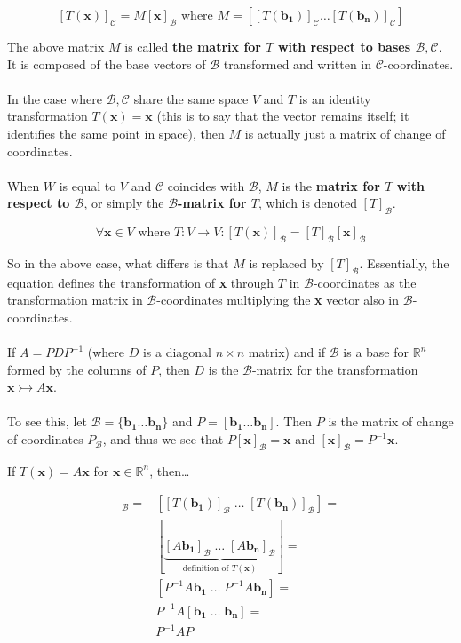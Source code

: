 \documentclass[12pt]{article}
\newcommand{\R}{\mathbb{R}}
\newcommand{\bt}[1]{\textbf{{#1}}}
\newcommand{\bm}[1]{\mathbf{{#1}}}
\newcommand{\mmc}[1]{\mathcal{{#1}}}
\newcommand{\set}[1]{\{{#1}\}}
\begin{document}
$$[T(\bm{x})]_\mmc{C} = M[\bm{x}]_\mmc{B} \textrm{ where } M = [[T(\bm{b_1})]_\mmc{C} \dots [T(\bm{b_n})]_\mmc{C}]$$

The above matrix $M$ is called \bt{the matrix for $T$ with respect to bases $\mmc{B, C}$}. It is composed of the base vectors of $\mmc{B}$ transformed and written
in $\mmc{C}$-coordinates. \\ \\

In the case where $\mmc{B, C}$ share the same space $V$ and $T$ is an identity transformation
$T(\bm{x}) = \bm{x}$ (this is to say that the vector remains itself; it identifies the same point in space),
then $M$ is actually just a matrix of change of coordinates. \\ \\

When $W$ is equal to $V$ and $\mmc{C}$ coincides with $\mmc{B}$, $M$ is the \bt{matrix for $T$ with respect to $\mmc{B}$},
or simply the \bt{$\mmc{B}$-matrix for $T$}, which is denoted $[T]_\mmc{B}$.

$$\forall \bm{x} \in V \textrm{ where } T: V \rightarrow V: [T(\bm{x})]_\mmc{B} = [T]_\mmc{B}[\bm{x}]_\mmc{B}$$

So in the above case, what differs is that $M$ is replaced by $[T]_\mmc{B}$. Essentially,
the equation defines the transformation of \bt{x} through $T$ in $\mmc{B}$-coordinates as the transformation
matrix in $\mmc{B}$-coordinates multiplying the \bt{x} vector also in $\mmc{B}$-coordinates. \\ \\

If $A = PDP^{-1}$ (where $D$ is a diagonal $n \times n$ matrix) and if $\mmc{B}$ is a base for $\R^n$
formed by the columns of $P$, then $D$ is the $\mmc{B}$-matrix for the transformation $\bm{x} \rightarrowtail A\bm{x}$. \\ \\

To see this, let $\mmc{B} = \set{\bm{b_1 \dots b_n}}$ and $P = [\bm{b_1 \dots b_n}]$. Then $P$ is the matrix of change of coordinates
$P_\mmc{B}$, and thus we see that $P[\bm{x}]_\mmc{B} = \bm{x}$ and $[\bm{x}]_\mmc{B} = P^{-1}\bm{x}$.


If $T(\bm{x}) = A\bm{x}$ for $\bm{x} \in \R^n$, then\dots

\begin{align*}
    [T]_\mmc{B} =
    & [[T(\bm{b_1})]_\mmc{B}\; \dots\; [T(\bm{b_n})]_\mmc{B}] =  \\
    & [\underbrace{[A\bm{b_1}]_\mmc{B}\; \dots\; [A\bm{b_n}]_\mmc{B}}_{\textrm{definition of $T(\bm{x})$}}] = \\
    & [P^{-1}A\bm{b_1}\; \dots\; P^{-1}A\bm{b_n}] = \\
    & P^{-1}{A[\bm{b_1}\; \dots\; \bm{b_n}]} = \\
    & P^{-1}AP
\end{align*}
\end{document}
